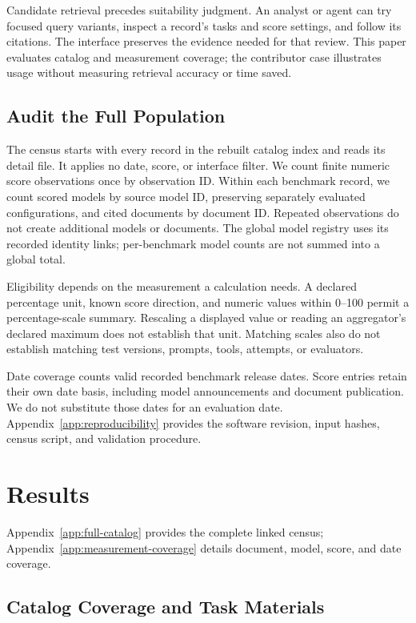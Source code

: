 \documentclass[11pt]{article}
\begin{document}
Candidate retrieval precedes suitability judgment. An analyst or agent can try focused query variants, inspect a record's tasks and score settings, and follow its citations. The interface preserves the evidence needed for that review. This paper evaluates catalog and measurement coverage; the contributor case illustrates usage without measuring retrieval accuracy or time saved.

\subsection{Audit the Full Population}
\label{sec:census-method}

The census starts with every record in the rebuilt catalog index and reads its detail file. It applies no date, score, or interface filter. We count finite numeric score observations once by observation ID. Within each benchmark record, we count scored models by source model ID, preserving separately evaluated configurations, and cited documents by document ID. Repeated observations do not create additional models or documents. The global model registry uses its recorded identity links; per-benchmark model counts are not summed into a global total.

Eligibility depends on the measurement a calculation needs. A declared percentage unit, known score direction, and numeric values within 0--100 permit a percentage-scale summary. Rescaling a displayed value or reading an aggregator's declared maximum does not establish that unit. Matching scales also do not establish matching test versions, prompts, tools, attempts, or evaluators.

Date coverage counts valid recorded benchmark release dates. Score entries retain their own date basis, including model announcements and document publication. We do not substitute those dates for an evaluation date. Appendix~\ref{app:reproducibility} provides the software revision, input hashes, census script, and validation procedure.

\section{Results}
\label{sec:results}

Appendix~\ref{app:full-catalog} provides the complete linked census; Appendix~\ref{app:measurement-coverage} details document, model, score, and date coverage.

\subsection{Catalog Coverage and Task Materials}
\end{document}
